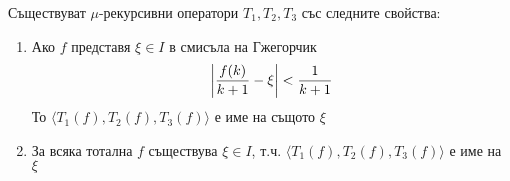 \begin{lemma}[ретракция]\label{lem:retraction}
    Съществуват $\mu$-рекурсивни оператори $T_1, T_2, T_3$ със следните свойства:
    \begin{enumerate}
        \item Ако $f$ представя $\xi \in I$ в смисъла на Гжегорчик
        \begin{equation}
            \left|\frac{f(k)}{k+1} -\xi\right| < \frac{1}{k+1}
        \end{equation}
        То $\langle T_1(f), T_2(f), T_3(f)\rangle$ е име на същото $\xi$
        \item За всяка тотална $f$ съществува $\xi \in I$, т.ч. $\langle T_1(f), T_2(f), T_3(f)\rangle$ е име на $\xi$
    \end{enumerate}
\end{lemma}
